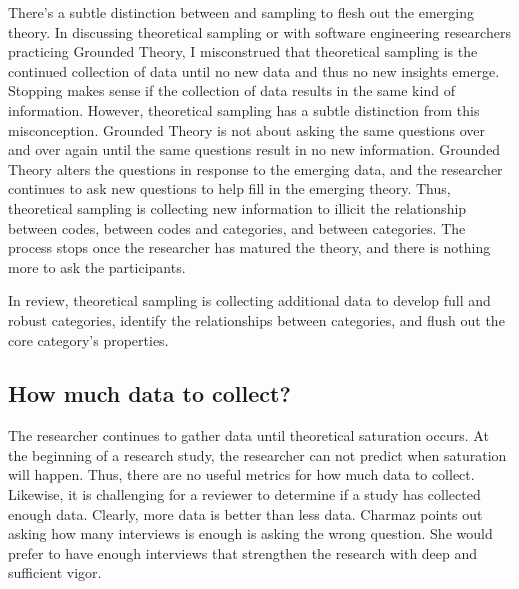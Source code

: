 There's a subtle distinction between  and sampling to flesh out the emerging theory. In discussing theoretical sampling or  with software engineering researchers practicing Grounded Theory, I misconstrued that theoretical sampling is the continued collection of data until no new data and thus no new insights emerge. Stopping makes sense if the collection of data results in the same kind of information. However, theoretical sampling has a subtle distinction from this misconception. Grounded Theory is not about asking the same questions over and over again until the same questions result in no new information. Grounded Theory alters the questions in response to the emerging data, and the researcher continues to ask new questions to help fill in the emerging theory. Thus, theoretical sampling is collecting new information to illicit the relationship between codes, between codes and categories, and between categories. The process stops once the researcher has matured the theory, and there is nothing more to ask the participants. 



In review, theoretical sampling is collecting additional data to develop full and robust categories, identify the relationships between categories, and flush out the core category's properties.

\subsection{How much data to collect?}
The researcher continues to gather data until theoretical saturation occurs. At the beginning of a research study, the researcher can not predict when saturation will happen. Thus, there are no useful metrics for how much data to collect. Likewise, it is challenging for a reviewer to determine if a study has collected enough data. Clearly, more data is better than less data. Charmaz points out asking how many interviews is enough is asking the wrong question. She would prefer to have enough interviews that strengthen the research with deep and sufficient vigor. 

